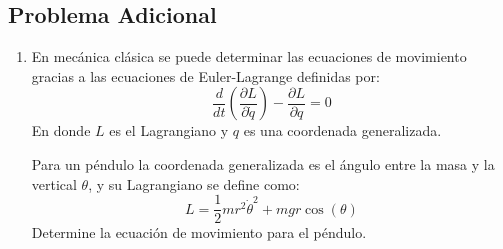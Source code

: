 \documentclass[letterpaper,11pt]{article}
\begin{document}
\subsection*{Problema Adicional}
\begin{enumerate}
    \item En mecánica clásica se puede determinar las ecuaciones de movimiento gracias a las ecuaciones de Euler-Lagrange definidas por:
    \[\frac{d}{dt}\left(\frac{\partial L}{\partial \dot q}\right)- \frac{\partial L}{\partial q}=0\]
    En donde $L$ es el Lagrangiano y $q$ es una coordenada generalizada. 
    
    Para un péndulo la coordenada generalizada es el ángulo entre la masa y la vertical $\theta$, y su Lagrangiano se define como:
    \[L=\frac{1}{2}mr^2{\dot\theta}^2+mgr\cos(\theta)\]
    Determine la ecuación de movimiento para el péndulo.
\end{enumerate}
\end{document}
